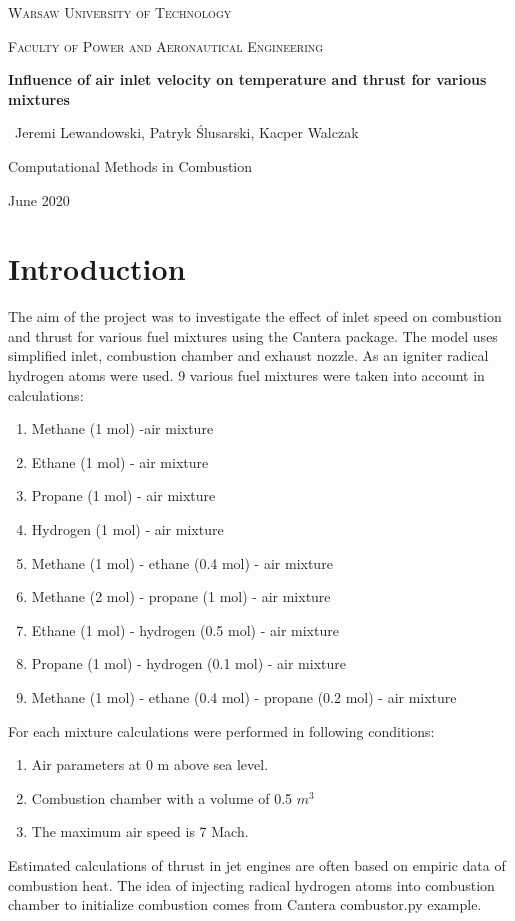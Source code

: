 \documentclass[a4paper,11pt]{article}
\begin{document}
\begin{titlepage}
	\centering
	{\scshape\LARGE Warsaw University of Technology \par}
	\vspace{1cm}
	{\scshape\Large Faculty of Power and Aeronautical Engineering\par}
	\vspace{3.5cm}
	{\huge\bfseries Influence of air inlet velocity on temperature and thrust for various mixtures\par}
	\vspace{2cm}
	{\Large\ Jeremi Lewandowski, Patryk Ślusarski, Kacper Walczak\par}
	\vfill
	Computational Methods in Combustion\par

	\vfill

	{\large June 2020\par}
\end{titlepage}

\newpage
\tableofcontents

\newpage

\section{Introduction}
The aim of the project was to investigate the effect of inlet speed on combustion and thrust for various fuel mixtures using the Cantera package. The model uses simplified inlet, combustion chamber and exhaust nozzle. As an igniter radical hydrogen atoms were used. 9 various fuel mixtures were taken into account in calculations:
\begin{enumerate}
	\item Methane (1 mol)  -air mixture
	\item Ethane (1 mol) - air mixture
	\item Propane (1 mol) - air mixture
	\item Hydrogen (1 mol) - air mixture
	\item Methane (1 mol) - ethane (0.4 mol) - air mixture
	\item Methane (2 mol) - propane (1 mol) - air mixture
	\item Ethane (1 mol) - hydrogen (0.5 mol) - air mixture
	\item Propane (1 mol) - hydrogen (0.1 mol) - air mixture
	\item Methane (1 mol) - ethane (0.4 mol) - propane (0.2 mol) - air mixture
\end{enumerate}
For each mixture calculations were performed in following conditions:
\begin{enumerate}
  \item Air parameters at 0 m above sea level.
  \item Combustion chamber with a volume of 0.5 $m^3$
  \item The maximum air speed is 7 Mach.
\end{enumerate}
Estimated calculations of thrust in jet engines are often based on empiric data of combustion heat. The idea of injecting radical hydrogen atoms into combustion chamber to initialize combustion comes from Cantera combustor.py example.
\newpage
\end{document}
